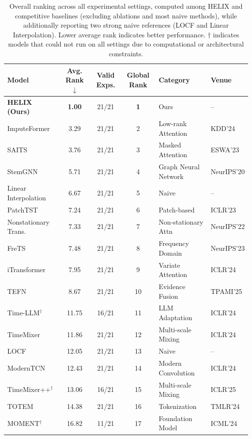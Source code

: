 \begin{table}[t]
    \caption{Overall ranking across all experimental settings, computed among HELIX and competitive baselines (excluding ablations and most naive methods), while additionally reporting two strong naive references (LOCF and Linear Interpolation). Lower average rank indicates better performance. $\dagger$ indicates models that could not run on all settings due to computational or architectural constraints.}
    \label{tab:main_ranking}
    \centering
    \begin{small}
    \begin{tabular}{l|ccc|ll}
        \toprule
        \textbf{Model} & \textbf{Avg. Rank} $\downarrow$ & \textbf{Valid Exps.} & \textbf{Global Rank} & \textbf{Category} & \textbf{Venue} \\
        \midrule
        \textbf{HELIX (Ours)} & \textbf{1.00} & 21/21 & \textbf{1} & Ours & -- \\
        ImputeFormer & 3.29 & 21/21 & 2 & Low-rank Attention & KDD'24 \\
        SAITS & 3.76 & 21/21 & 3 & Masked Attention & ESWA'23 \\
        StemGNN & 5.71 & 21/21 & 4 & Graph Neural Network & NeurIPS'20 \\
        Linear Interpolation & 6.67 & 21/21 & 5 & Naive & -- \\
        PatchTST & 7.24 & 21/21 & 6 & Patch-based & ICLR'23 \\
        Nonstationary Trans. & 7.33 & 21/21 & 7 & Non-stationary Attn & NeurIPS'22 \\
        FreTS & 7.48 & 21/21 & 8 & Frequency Domain & NeurIPS'23 \\
        iTransformer & 7.95 & 21/21 & 9 & Variate Attention & ICLR'24 \\
        TEFN & 8.67 & 21/21 & 10 & Evidence Fusion & TPAMI'25 \\
        Time-LLM$^\dagger$ & 11.75 & 16/21 & 11 & LLM Adaptation & ICLR'24 \\
        TimeMixer & 11.86 & 21/21 & 12 & Multi-scale Mixing & ICLR'24 \\
        LOCF & 12.05 & 21/21 & 13 & Naive & -- \\
        ModernTCN & 12.43 & 21/21 & 14 & Modern Convolution & ICLR'24 \\
        TimeMixer++$^\dagger$ & 13.06 & 16/21 & 15 & Multi-scale Mixing & ICLR'25 \\
        TOTEM & 14.38 & 21/21 & 16 & Tokenization & TMLR'24 \\
        MOMENT$^\dagger$ & 16.82 & 11/21 & 17 & Foundation Model & ICML'24 \\
        \bottomrule
    \end{tabular}
    \end{small}
\end{table}